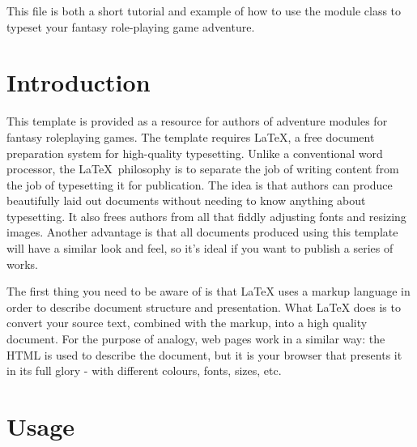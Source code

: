 \documentclass[a4paper,serif]{module}       %
\begin{document}

\maketitle







\showtitle

This file is both a short tutorial and example of how to use the module class to typeset your fantasy role-playing game adventure.

\part{Introduction}

This template is provided as a resource for authors of adventure modules for fantasy roleplaying games.
The template requires \LaTeX, a free document preparation system for high-quality typesetting. Unlike a conventional
word processor, the \LaTeX~philosophy is to separate the job of writing content from the job of typesetting it for
publication. The idea is that authors can produce beautifully laid out documents without needing to know anything
about typesetting. It also frees authors from all that fiddly adjusting fonts and resizing images. Another advantage
is that all documents produced using this template will have a similar look and feel, so it's ideal if you want to
publish a series of works.

The first thing you need to be aware of is that LaTeX uses a markup language in order to describe document structure and presentation. What LaTeX does is to convert your source text, combined with the markup, into a high quality document. For the purpose of analogy, web pages work in a similar way: the HTML is used to describe the document, but it is your browser that presents it in its full glory - with different colours, fonts, sizes, etc.

\part{Usage}
\end{document}
